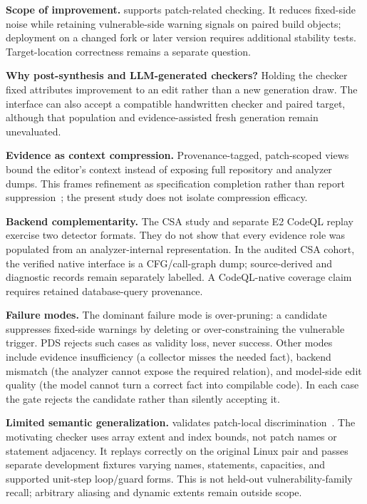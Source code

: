 \noindent\textbf{Scope of improvement.}\quad
\toolname supports patch-related checking. It reduces fixed-side noise while retaining vulnerable-side warning signals on paired build objects; deployment on a changed fork or later version requires additional stability tests. Target-location correctness remains a separate question.

\noindent\textbf{Why post-synthesis and LLM-generated checkers?}\quad
Holding the checker fixed attributes improvement to an edit rather than a new generation draw. The interface can also accept a compatible handwritten checker and paired target, although that population and evidence-assisted fresh generation remain unevaluated.

\noindent\textbf{Evidence as context compression.}\quad
Provenance-tagged, patch-scoped views bound the editor's context instead of exposing full repository and analyzer dumps. This frames refinement as specification completion rather than report suppression~\cite{clarke2000cegar,solarlezama2006sketch,nguyen2013semfix,mechtaev2016angelix,long2016prophet}; the present study does not isolate compression efficacy.

\noindent\textbf{Backend complementarity.}\quad
The CSA study and separate E2 CodeQL replay exercise two detector formats. They do not show that every evidence role was populated from an analyzer-internal representation.  In the audited CSA cohort, the verified native interface is a CFG/call-graph dump; source-derived and diagnostic records remain separately labelled.  A CodeQL-native coverage claim requires retained database-query provenance.

\noindent\textbf{Failure modes.}\quad
The dominant failure mode is over-pruning: a candidate suppresses fixed-side warnings by deleting or over-constraining the vulnerable trigger.  PDS rejects such cases as validity loss, never success.  Other modes include evidence insufficiency (a collector misses the needed fact), backend mismatch (the analyzer cannot expose the required relation), and model-side edit quality (the model cannot turn a correct fact into compilable code).  In each case the gate rejects the candidate rather than silently accepting it.

\noindent\textbf{Limited semantic generalization.}\quad
\toolname validates patch-local discrimination~\cite{chakraborty2021deep,pearce2022copilot,perry2023users,khoury2023chatgpt}. The motivating checker uses array extent and index bounds, not patch names or statement adjacency. It replays correctly on the original Linux pair and passes separate development fixtures varying names, statements, capacities, and supported unit-step loop/guard forms. This is not held-out vulnerability-family recall; arbitrary aliasing and dynamic extents remain outside scope.

